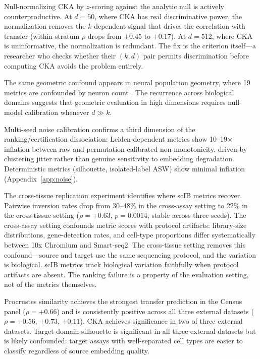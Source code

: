 \documentclass[11pt]{article}
\begin{document}
Null-normalizing CKA by $z$-scoring against the analytic null is
actively counterproductive. At $d = 50$, where CKA has real
discriminative power, the normalization removes the $k$-dependent signal
that drives the correlation with transfer (within-stratum $\rho$ drops
from $+0.45$ to $+0.17$). At $d = 512$, where CKA is uninformative,
the normalization is redundant. The fix is the criterion itself---a
researcher who checks whether their $(k, d)$ pair permits discrimination
before computing CKA avoids the problem entirely.

The same geometric confound appears in neural population geometry, where
19 metrics are confounded by neuron count \citep{tower2026bracket}. The
recurrence across biological domains suggests that geometric evaluation
in high dimensions requires null-model calibration whenever $d \gg k$.

Multi-seed noise calibration confirms a third dimension of the
ranking/certification dissociation: Leiden-dependent metrics show
10--19$\times$ inflation between raw and permutation-calibrated
non-monotonicity, driven by clustering jitter rather than genuine
sensitivity to embedding degradation. Deterministic metrics (silhouette,
isolated-label ASW) show minimal inflation
(Appendix~\ref{app:noise}).

The cross-tissue replication experiment identifies where scIB metrics
recover. Pairwise inversion rates drop from 30--48\% in the cross-assay
setting to 22\% in the cross-tissue setting ($\rho = +0.63$,
$p = 0.0014$, stable across three seeds). The cross-assay setting
confounds metric scores with protocol artifacts: library-size
distributions, gene-detection rates, and cell-type proportions differ
systematically between 10x Chromium and Smart-seq2. The cross-tissue
setting removes this confound---source and target use the same
sequencing protocol, and the variation is biological. scIB metrics track
biological variation faithfully when protocol artifacts are absent. The
ranking failure is a property of the evaluation setting, not of the
metrics themselves.

Procrustes similarity achieves the strongest transfer prediction in the
Census panel ($\rho = +0.66$) and is consistently positive across all
three external datasets ($\rho = +0.56$, $+0.73$, $+0.11$). CKA
achieves significance in two of three external datasets. Target-domain
silhouette is significant in all three external datasets but is likely
confounded: target assays with well-separated cell types are easier to
classify regardless of source embedding quality.
\end{document}
